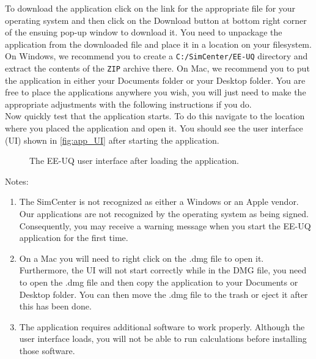 To download the \thisSoftware application click on the link for the appropriate file for your operating system  and then click on the Download button at bottom right corner of the ensuing pop-up window to download it. You need to unpackage the application from the downloaded file and place it in a location on your filesystem. On Windows, we recommend you to create a \texttt{C:/SimCenter/EE-UQ} directory and extract the contents of the \texttt{ZIP} archive there. On Mac, we recommend you to put the application in either your Documents folder or your Desktop folder. You are free to place the applications anywhere you wish, you will just need to make the appropriate adjustments with the following instructions if you do. \\

Now quickly test that the application starts. To do this navigate to the location where you placed the application and open it. You should see the user interface (UI) shown in  \autoref{fig:app_UI} after starting the application.\\

\begin{figure}[!htbp]
  \caption{The EE-UQ user interface after loading the application.}
  \label{fig:app_UI}
\end{figure}

Notes: 
\begin{enumerate}
\item The SimCenter is not recognized as either a Windows or an Apple vendor. Our applications are not recognized by the operating system as being signed. Consequently, you may receive a warning message when you start the EE-UQ application for the first time.
\item  On a Mac you will need to right click on the .dmg file to open it. Furthermore, the UI will not start correctly while in the DMG file, you need to open the .dmg file and then copy the \thisSoftware application to your Documents or Desktop folder. You can then move the .dmg file to the trash or eject it after this has been done.
\item  The \thisSoftware application requires additional software to work properly. Although the user interface loads, you will not be able to run calculations before installing those software.
\end{enumerate}



